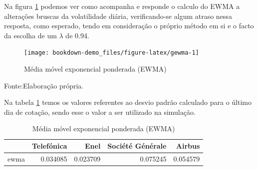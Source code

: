 \documentclass[
  12pt,
  a4paper,
  openany]{book}
\newenvironment{Shaded}{\begin{snugshade}}{\end{snugshade}}
\newcommand{\AttributeTok}[1]{\textcolor[rgb]{0.77,0.63,0.00}{#1}}
\newcommand{\CommentTok}[1]{\textcolor[rgb]{0.56,0.35,0.01}{\textit{#1}}}
\newcommand{\ControlFlowTok}[1]{\textcolor[rgb]{0.13,0.29,0.53}{\textbf{#1}}}
\newcommand{\DecValTok}[1]{\textcolor[rgb]{0.00,0.00,0.81}{#1}}
\newcommand{\FloatTok}[1]{\textcolor[rgb]{0.00,0.00,0.81}{#1}}
\newcommand{\FunctionTok}[1]{\textcolor[rgb]{0.00,0.00,0.00}{#1}}
\newcommand{\NormalTok}[1]{#1}
\newcommand{\OtherTok}[1]{\textcolor[rgb]{0.56,0.35,0.01}{#1}}
\newcommand{\SpecialCharTok}[1]{\textcolor[rgb]{0.00,0.00,0.00}{#1}}
\newcommand{\StringTok}[1]{\textcolor[rgb]{0.31,0.60,0.02}{#1}}
\theoremstyle{definition}
\theoremstyle{definition}
\theoremstyle{definition}
\theoremstyle{remark}
\begin{document}
\begin{Shaded}
\end{Shaded}

\normalsize

Na figura \ref{fig:gewma} podemos ver como acompanha e responde o calculo do EWMA a alterações bruscas da volatilidade diária, verificando-se algum atraso nessa resposta, como esperado, tendo em consideração o próprio método em si e o facto da escolha de um \(\lambda\) de 0.94.

\begin{figure}

{\centering \texttt{[image: bookdown-demo\_files/figure-latex/gewma-1]} 

}

\caption{Média móvel exponencial ponderada (EWMA)}\label{fig:gewma}
\end{figure}
\FloatBarrier
\centering

Fonte:Elaboração própria.

\justifying
\bigskip

Na tabela \ref{tab:ewmaval} temos os valores referentes ao desvio padrão calculado para o último dia de cotação, sendo esse o valor a ser utilizado na simulação.

\begin{table}[!h]

\caption{\label{tab:ewmaval}Média móvel exponencial ponderada (EWMA)}
\centering
\begin{tabular}[t]{lrrrr}
\toprule
  & Telefónica & Enel & Société Générale  & Airbus\\
\midrule
ewma & 0.034085 & 0.023709 & 0.075245 & 0.054579\\
\bottomrule
\end{tabular}
\end{table}
\FloatBarrier
\centering
\end{document}
